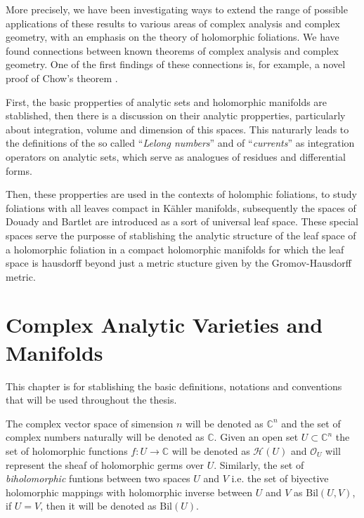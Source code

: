 \documentclass[12pt,twoside,a4paper]{report}
\newcommand{\co}{\ensuremath{\mathbb C }}
\newcommand{\con}{\ensuremath{\mathbb{C}^n}}
\begin{document}
More precisely, we have been investigating ways to extend the range of possible applications of these results to various areas of complex analysis and complex geometry, with an emphasis on the theory of holomorphic foliations. We have found connections between known theorems of complex analysis and complex geometry. One of the first findings of these connections is, for example, a novel proof of Chow's theorem \cite{Chow}.

First, the basic propperties of analytic sets and holomorphic manifolds are stablished, then there is a discussion on their analytic propperties, particularly about integration, volume and dimension of this spaces. This naturarly leads to the definitions of the so called ``\emph{Lelong numbers}'' and of ``\emph{currents}'' as integration operators on analytic sets, which serve as analogues of residues and differential forms.

Then, these propperties are used in the contexts of holomphic foliations, to study foliations with all leaves compact in Kähler manifolds, subsequently the spaces of Douady and Bartlet are introduced as a sort of universal leaf space. These special spaces serve the purposse of stablishing the analytic structure of the leaf space of a holomorphic foliation in a compact holomorphic manifolds for which the leaf space is hausdorff beyond just a metric stucture given by the Gromov-Hausdorff metric.

\chapter{Complex Analytic Varieties and Manifolds}
\pagestyle{fancy}
\fancyhf{}
\fancyhead[LE]{\rightmark}
\fancyhead[RO]{\leftmark}
\fancyfoot[C]{\thepage}
This chapter is for stablishing the basic definitions, notations and conventions that will be used throughout the thesis. 

The complex vector space of simension $n$ will be denoted as $\con$ and the set of complex numbers naturally will be denoted as $\co$. Given an open set $U\subset\con$ the set of holomorphic functions $f:U\rightarrow\co$ will be denoted as $\mathcal{H}(U)$ and $\mathcal{O}_{U}$ will represent the sheaf of holomorphic germs over $U$. Similarly, the set of \emph{biholomorphic} funtions between two spaces $U$ and $V$ i.e. the set of biyective holomorphic mappings with holomorphic inverse between $U$ and $V$ as $\mathrm{Bil}(U,V)$, if $U=V$, then it will be denoted as $\mathrm{Bil}(U).$
\end{document}
